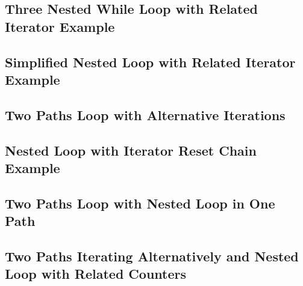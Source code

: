 % 
\subsection{Three Nested While Loop with Related Iterator Example}

\subsection{Simplified Nested Loop with Related Iterator Example}

\subsection{Two Paths Loop with Alternative Iterations}


\subsection{Nested Loop with Iterator Reset Chain Example}

\subsection{Two Paths Loop with Nested Loop in One Path}


\subsection{Two Paths Iterating Alternatively and Nested Loop with Related Counters}


